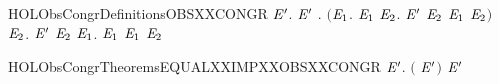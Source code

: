 \newcommand{\HOLObsCongrDate}{21 June 2020}
\newcommand{\HOLObsCongrTime}{18:11}
\begin{SaveVerbatim}{HOLObsCongrDefinitionsOBSXXCONGR}
\HOLTokenTurnstile{} \HOLSymConst{\HOLTokenForall{}} \ensuremath{\HOLBoundVar{E}\sp{\prime}}.
         \ensuremath{\HOLBoundVar{E}\sp{\prime}} \HOLSymConst{\HOLTokenEquiv{}}
       \HOLSymConst{\HOLTokenForall{}}.
           \ensuremath{(}\HOLSymConst{\HOLTokenForall{}}\ensuremath{\HOLBoundVar{E}\sb{\mathrm{1}}}.  \HOLTokenTransBegin{}\HOLTokenTransEnd \ensuremath{\HOLBoundVar{E}\sb{\mathrm{1}}} \HOLSymConst{\HOLTokenImp{}} \HOLSymConst{\HOLTokenExists{}}\ensuremath{\HOLBoundVar{E}\sb{\mathrm{2}}}. \ensuremath{\HOLBoundVar{E}\sp{\prime}} \HOLTokenWeakTransBegin{}\HOLTokenWeakTransEnd \ensuremath{\HOLBoundVar{E}\sb{\mathrm{2}}} \HOLSymConst{\HOLTokenConj{}}  \ensuremath{\HOLBoundVar{E}\sb{\mathrm{1}}} \ensuremath{\HOLBoundVar{E}\sb{\mathrm{2}}}\ensuremath{)} \HOLSymConst{\HOLTokenConj{}}
           \HOLSymConst{\HOLTokenForall{}}\ensuremath{\HOLBoundVar{E}\sb{\mathrm{2}}}. \ensuremath{\HOLBoundVar{E}\sp{\prime}} \HOLTokenTransBegin{}\HOLTokenTransEnd \ensuremath{\HOLBoundVar{E}\sb{\mathrm{2}}} \HOLSymConst{\HOLTokenImp{}} \HOLSymConst{\HOLTokenExists{}}\ensuremath{\HOLBoundVar{E}\sb{\mathrm{1}}}.  \HOLTokenWeakTransBegin{}\HOLTokenWeakTransEnd \ensuremath{\HOLBoundVar{E}\sb{\mathrm{1}}} \HOLSymConst{\HOLTokenConj{}}  \ensuremath{\HOLBoundVar{E}\sb{\mathrm{1}}} \ensuremath{\HOLBoundVar{E}\sb{\mathrm{2}}}
\end{SaveVerbatim}
\newcommand{\HOLObsCongrDefinitionsOBSXXCONGR}{\UseVerbatim{HOLObsCongrDefinitionsOBSXXCONGR}}
\newcommand{\HOLObsCongrDefinitions}{
\HOLDfnTag{ObsCongr}{OBS_CONGR}\HOLObsCongrDefinitionsOBSXXCONGR
}
\begin{SaveVerbatim}{HOLObsCongrTheoremsEQUALXXIMPXXOBSXXCONGR}
\HOLTokenTurnstile{} \HOLSymConst{\HOLTokenForall{}} \ensuremath{\HOLBoundVar{E}\sp{\prime}}. \ensuremath{(} \HOLSymConst{\ensuremath{=}} \ensuremath{\HOLBoundVar{E}\sp{\prime}}\ensuremath{)} \HOLSymConst{\HOLTokenImp{}}   \ensuremath{\HOLBoundVar{E}\sp{\prime}}
\end{SaveVerbatim}
\newcommand{\HOLObsCongrTheoremsEQUALXXIMPXXOBSXXCONGR}{\UseVerbatim{HOLObsCongrTheoremsEQUALXXIMPXXOBSXXCONGR}}

